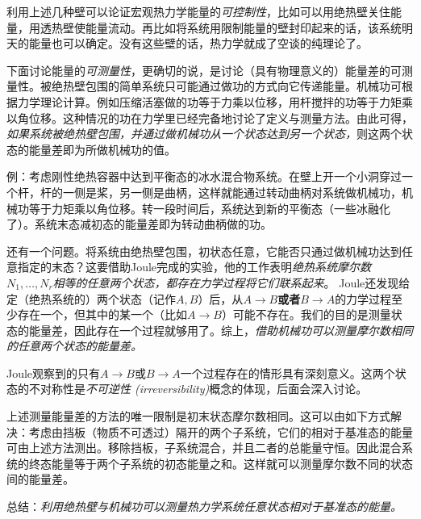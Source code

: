 利用上述几种壁可以论证宏观热力学能量的{\it 可控制性}，比如可以用绝热壁关住能量，用透热壁使能量流动。再比如将系统用限制能量的壁封印起来的话，该系统明天的能量也可以确定。没有这些壁的话，热力学就成了空谈的纯理论了。

下面讨论能量的{\it 可测量性}，更确切的说，是讨论（具有物理意义的）能量差的可测量性。被绝热壁包围的简单系统只可能通过做功的方式向它传递能量。机械功可根据力学理论计算。例如压缩活塞做的功等于力乘以位移，用杆搅拌的功等于力矩乘以角位移。这种情况的功在力学里已经完备地讨论了定义与测量方法。由此可得，{\it 如果系统被绝热壁包围，并通过做机械功从一个状态达到另一个状态，}则这两个状态的能量差即为所做机械功的值。 

例：考虑刚性绝热容器中达到平衡态的冰水混合物系统。在壁上开一个小洞穿过一个杆，杆的一侧是桨，另一侧是曲柄，这样就能通过转动曲柄对系统做机械功，机械功等于力矩乘以角位移。转一段时间后，系统达到新的平衡态（一些冰融化了）。系统末态减初态的能量差即为转动曲柄做的功。

还有一个问题。将系统由绝热壁包围，初状态任意，它能否只通过做机械功达到任意指定的末态？这要借助Joule完成的实验，他的工作表明{\it 绝热系统摩尔数$N_1, \dots, N_r$相等的任意两个状态，都存在力学过程将它们联系起来}。 Joule还发现给定（绝热系统的）两个状态（记作$A, B$）后，从$A \to B${\bf 或者}$B \to A$的力学过程至少存在一个，但其中的某一个（比如$A \to B$）可能不存在。我们的目的是测量状态的能量差，因此存在一个过程就够用了。综上，{\it 借助机械功可以测量摩尔数相同的任意两个状态的能量差。}

Joule观察到的只有$A \to B$或$B \to A$一个过程存在的情形具有深刻意义。这两个状态的不对称性是{\it 不可逆性 (irreversibility)}概念的体现，后面会深入讨论。

上述测量能量差的方法的唯一限制是初末状态摩尔数相同。这可以由如下方式解决：考虑由挡板（物质不可透过）隔开的两个子系统，它们的相对于基准态的能量可由上述方法测出。移除挡板，子系统混合，并且二者的总能量守恒。因此混合系统的终态能量等于两个子系统的初态能量之和。这样就可以测量摩尔数不同的状态间的能量差。

总结：{\it 利用绝热壁与机械功可以测量热力学系统任意状态相对于基准态的能量。}

